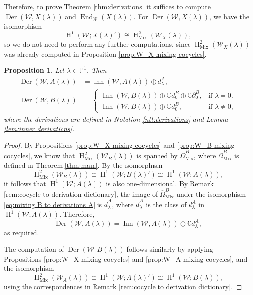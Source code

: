 \documentclass[11pt, svgnames]{amsart}
\DeclareMathOperator{\End}{End}
\newcommand{\CC}{\mathbb{C}}
\newcommand{\PP}{\mathbb{P}}
\newcommand{\W}{\mathcal{W}}
\DeclareMathOperator{\Der}{Der}
\DeclareMathOperator{\Inn}{Inn}
\newcommand{\del}{\partial}
\DeclareMathOperator{\HH}{H}
\DeclareMathOperator{\Mix}{Mix}
\newtheorem{proposition}{Proposition}[section]
\theoremstyle{definition}
\begin{document}
Therefore, to prove Theorem \ref{thm:derivations} it suffices to compute $\Der(\W,X(\lambda))$ and $\End_\W(X(\lambda))$. For $\Der(\W,X(\lambda))$, we have the isomorphism
$$\HH^1(\W;X(\lambda)') \cong \HH_{\Mix}^2(\W_X(\lambda)),$$
so we do not need to perform any further computations, since $\HH_{\Mix}^2(\W_X(\lambda))$ was already computed in Proposition \ref{prop:W_X mixing cocycles}.

\begin{proposition}\label{prop:derivations W to X}
    Let $\lambda \in \PP^1$. Then
    \begin{align*}
        \Der(\W,A(\lambda)) &= \Inn(\W,A(\lambda)) \oplus d_\lambda^A, \\
        \Der(\W,B(\lambda)) &= \begin{cases}
            \Inn(\W,B(\lambda)) \oplus \CC d_0^B \oplus \CC \del_0^B, &\text{if } \lambda = 0, \\
            \Inn(\W,B(\lambda)) \oplus \CC d_0^B, &\text{if } \lambda \neq 0,
        \end{cases}
    \end{align*}
    where the derivations are defined in Notation \ref{ntt:derivations} and Lemma \ref{lem:inner derivations}.
\end{proposition}
\begin{proof}
    By Propositions \ref{prop:W_X mixing cocycles} and \ref{prop:W_B mixing cocycles}, we know that $\HH^2_{\Mix}(\W_B(\lambda))$ is spanned by $\overline{\Omega}_{\Mix}^B$, where $\overline{\Omega}_{\Mix}^B$ is defined in Theorem \ref{thm:main}. By the isomorphism
    \begin{equation}\label{eq:mixing B to derivations A}
        \HH^2_{\Mix}(\W_B(\lambda)) \cong \HH^1(\W;B(\lambda)') \cong \HH^1(\W;A(\lambda)),
    \end{equation}
    it follows that $\HH^1(\W;A(\lambda))$ is also one-dimensional. By Remark \ref{rem:cocycle to derivation dictionary}, the image of $\overline{\Omega}_{\Mix}^B$ under the isomorphism \eqref{eq:mixing B to derivations A} is $\overline{d}_\lambda^A$, where $\overline{d}_\lambda^A$ is the class of $d_\lambda^A$ in $\HH^1(\W;A(\lambda))$. Therefore,
    $$\Der(\W,A(\lambda)) = \Inn(\W,A(\lambda)) \oplus \CC d_\lambda^A,$$
    as required.
    
    The computation of $\Der(\W,B(\lambda))$ follows similarly by applying Propositions \ref{prop:W_X mixing cocycles} and \ref{prop:W_A mixing cocycles}, and the isomorphism
    $$\HH^2_{\Mix}(\W_A(\lambda)) \cong \HH^1(\W;A(\lambda)') \cong \HH^1(\W;B(\lambda)),$$
    using the correspondences in Remark \ref{rem:cocycle to derivation dictionary}.
\end{proof}
\end{document}
